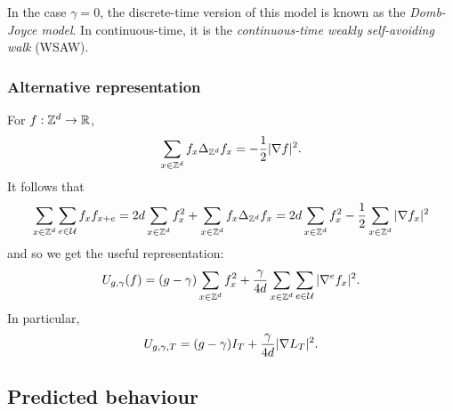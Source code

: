 In the case $\gamma = 0$, the discrete-time version of this model is known as
the \emph{Domb-Joyce model}. In continuous-time, it is the
\emph{continuous-time weakly self-avoiding walk} (WSAW).

\subsubsection{Alternative representation}

For $f : { {{\mathbb Z}}^d } \rightarrow {\mathbb R}$,
\begin{equation}
\label{e:sbp}
\sum_{x\in{ {{\mathbb Z}}^d }}   f_x \Delta_{{ {{\mathbb Z}}^d }} f_x
=
-\frac{1}{2} |\nabla f|^2.
\end{equation}
It follows that
\begin{equation}
\sum_{x\in{ {{\mathbb Z}}^d }} \sum_{e\in\mathcal{U}} f_x f_{x+e}
=
2 d \sum_{x\in{ {{\mathbb Z}}^d }} f_x^2
+ \sum_{x\in{ {{\mathbb Z}}^d }} f_x \Delta_{{ {{\mathbb Z}}^d }} f_x
=
2 d \sum_{x\in{ {{\mathbb Z}}^d }} f_x^2
- \frac{1}{2} \sum_{x\in{ {{\mathbb Z}}^d }} |\nabla f_x|^2
\end{equation}
and so we get the useful representation:
\begin{equation}
\label{e:Udef-pos}
U_{g,\gamma}(f)
= (g - \gamma) \sum_{x\in{ {{\mathbb Z}}^d }} f_x^2
+ \frac{\gamma}{4d} \sum_{x\in{ {{\mathbb Z}}^d }} \sum_{e\in\mathcal{U}} |\nabla^e f_x|^2.
\end{equation}
In particular,
\begin{equation}
  \label{e:V2}
  U_{g,\gamma,T} =
  (g - \gamma) I_T
  + \frac{\gamma}{4d}
  |\nabla L_T|^2
  .
\end{equation}


\subsection{Predicted behaviour}




